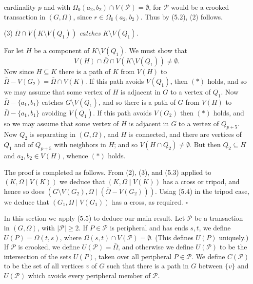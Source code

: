 \noindent cardinality $p$ and with $\Omega_0(a_2, b_2) \cap V(\mathcal{P}) = \emptyset$, for $\mathcal{P}$ would be a crooked transaction in $(G, \Omega)$, since $r \in \Omega_0(a_2, b_2)$. Thus by (5.2), (2) follows.

\hspace*{12pt}(3) \textit{$\bar{\Omega} \cap V(K \setminus V(Q_1))$ catches $K \setminus V(Q_1)$.}

For let $H$ be a component of $K \setminus V(Q_1)$. We must show that
\begin{equation*}
V(H) \cap \bar{\Omega} \cap V(K \setminus V(Q_1)) \ne \emptyset. \tag{$*$}
\end{equation*}
Now since $H \subseteq K$ there is a path of $K$ from $V(H)$ to $\bar{\Omega} - V(G_2) = \bar{\Omega} \cap V(K)$. If this path avoids $V(Q_1)$, then $(*)$ holds, and so we may assume that some vertex of $H$ is adjacent in $G$ to a vertex of $Q_1$. Now $\bar{\Omega} - \{a_1, b_1\}$ catches $G \setminus V(Q_1)$, and so there is a path of $G$ from $V(H)$ to $\bar{\Omega} - \{a_1, b_1\}$ avoiding $V(Q_1)$. If this path avoids $V(G_2)$ then $(*)$ holds, and so we may assume that some vertex of $H$ is adjacent in $G$ to a vertex of $Q_{p+5}$. Now $Q_2$ is separating in $(G, \Omega)$, and $H$ is connected, and there are vertices of $Q_1$ and of $Q_{p+5}$ with neighbors in $H$; and so $V(H \cap Q_2) \ne \emptyset$. But then $Q_2 \subseteq H$ and $a_2, b_2 \in V(H)$, whence $(*)$ holds.

The proof is completed as follows. From (2), (3), and (5.3) applied to $(K, \Omega \mid V(K))$ we deduce that $(K, \Omega \mid V(K))$ has a cross or tripod, and hence so does $(G \setminus V(G_2), \Omega \mid (\bar{\Omega} - V(G_2)))$. Using (5.4) in the tripod case, we deduce that $(G_1, \Omega \mid V(G_1))$ has a cross, as required. $\square$


In this section we apply (5.5) to deduce our main result. Let $\mathcal{P}$ be a transaction in $(G, \Omega)$, with $|\mathcal{P}| \ge 2$. If $P \in \mathcal{P}$ is peripheral and has ends $s, t$, we define $U(P) = \Omega(t, s)$, where $\Omega(s, t) \cap V(\mathcal{P}) = \emptyset$. (This defines $U(P)$ uniquely.) If $\mathcal{P}$ is crooked, we define $U(\mathcal{P}) = \bar{\Omega}$, and otherwise we define $U(\mathcal{P})$ to be the intersection of the sets $U(P)$, taken over all peripheral $P \in \mathcal{P}$. We define $C(\mathcal{P})$ to be the set of all vertices $v$ of $G$ such that there is a path in $G$ between $\{v\}$ and $U(\mathcal{P})$ which avoids every peripheral member of $\mathcal{P}$.

